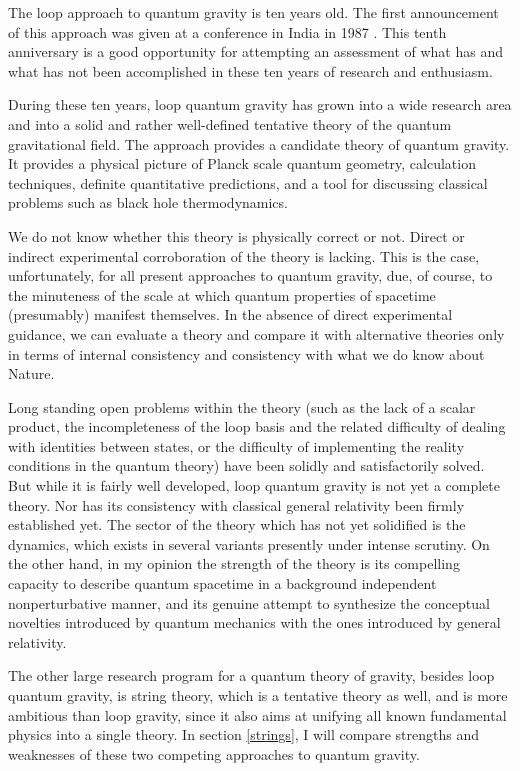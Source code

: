 \documentclass[12pt]{article}
\begin{document}
The loop approach to quantum gravity is ten years old.  The first 
announcement of this approach was given at a conference in India in 
1987 \cite{RovelliSmolin87}.  This tenth anniversary is a good 
opportunity for attempting an assessment of what has and what has not 
been accomplished in these ten years of research and enthusiasm.

During these ten years, loop quantum gravity has grown into a wide 
research area and into a solid and rather well-defined tentative 
theory of the quantum gravitational field.  The approach provides a 
candidate theory of quantum gravity.  It provides a physical picture 
of Planck scale quantum geometry, calculation techniques, definite 
quantitative predictions, and a tool for discussing classical problems 
such as black hole thermodynamics.

We do not know whether this theory is physically correct or not.  
Direct or indirect experimental corroboration of the theory is 
lacking.  This is the case, unfortunately, for all present approaches 
to quantum gravity, due, of course, to the minuteness of the scale at 
which quantum properties of spacetime (presumably) manifest 
themselves.  In the absence of direct experimental guidance, we can 
evaluate a theory and compare it with alternative theories only in 
terms of internal consistency and consistency with what we do know 
about Nature.

Long standing open problems within the theory (such as the lack of a 
scalar product, the incompleteness of the loop basis and the related 
difficulty of dealing with identities between states, or the 
difficulty of implementing the reality conditions in the quantum 
theory) have been solidly and satisfactorily solved.  But while it 
is fairly well developed, loop quantum gravity is not yet a complete 
theory.  Nor has its consistency with classical general relativity 
been firmly established yet.  The sector of the theory which has not 
yet solidified is the dynamics, which exists in several variants 
presently under intense scrutiny.  On the other hand, in my opinion the 
strength of the theory is its compelling capacity to describe quantum 
spacetime in a background independent nonperturbative manner, and its 
genuine attempt to synthesize the conceptual novelties introduced by 
quantum mechanics with the ones introduced by general relativity.

The other large research program for a quantum theory of gravity, 
besides loop quantum gravity, is string theory, which is a tentative 
theory as well, and is more ambitious than loop gravity, since it also 
aims at unifying all known fundamental physics into a single theory.  
In section \ref{strings}, I will compare strengths and weaknesses of 
these two competing approaches to quantum gravity.
\end{document}
